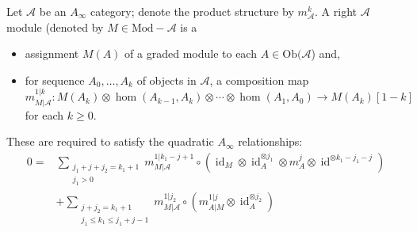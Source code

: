 
 
 
Let $\mathcal A$ be  an \emph{$A_\infty$} category; denote the product structure by $m^k_\mathcal A$. A right $\mathcal A$ module (denoted by $M\in \text{Mod}-\mathcal A$ is a 
\begin{itemize}
    \item assignment $M(A)$ of a graded module to each $A\in \text{Ob}(\mathcal A$) and,
    \item for sequence $A_0, \ldots, A_k$ of objects in $\mathcal A$, a composition map 
    \[
        m^{1|k}_{M|\mathcal A}:M(A_k)\otimes \hom(A_{k-1}, A_k)\otimes \cdots \otimes \hom(A_1, A_0)\to M(A_k)[1-k]
    \]
for each $k\geq 0$. 
\end{itemize}
These are required to satisfy the quadratic  $A_\infty$ relationships:
\begin{align*}
    0=&\sum_{\substack{ j_1+j+j_2=k_1+1\\j_1>0 }} m_{M|{\mathcal A}}^{1|k_1-j+1}\circ ( \operatorname{id}_M\otimes  \operatorname{id}_A^{\otimes j_1}\otimes m^{j}_A \otimes \operatorname{id}^{\otimes k_1-j_1-j})\\
    &+\sum_{\substack{ j+j_2=k_1+1\\j_1\leq k_1\leq j_1+j-1}} m_{M|\mathcal A}^{1|j_2} \circ (m_{A|M}^{1|j}\otimes  \operatorname{id}_A^{\otimes j_2})
\end{align*}

 